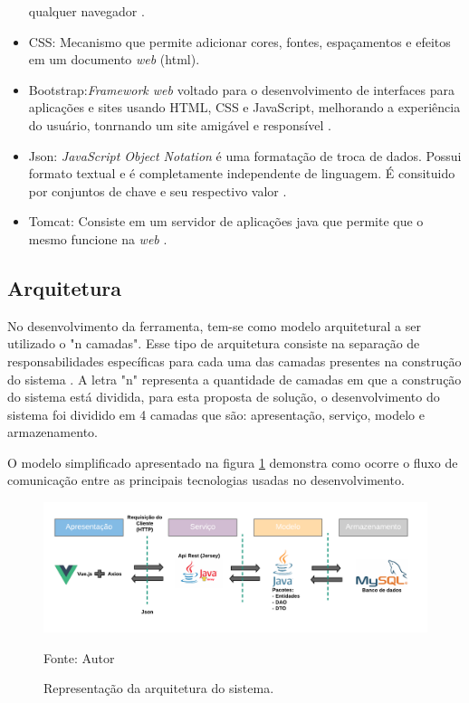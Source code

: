 \begin{itemize}
		qualquer navegador \cite{html}.
	\item CSS: Mecanismo que permite adicionar cores, fontes, espaçamentos e efeitos em um documento \textit{web} (html). \cite{css}
	\item Bootstrap:\textit{Framework web} voltado para o desenvolvimento de interfaces para aplicações e sites usando HTML, CSS e JavaScript, melhorando
		a experiência do usuário, tonrnando um site amigável e responsível \cite{bootstrap}.
	\item Json: \textit{JavaScript Object Notation} é uma formatação de troca de dados. Possui formato textual e é completamente independente de linguagem. É
		consituido por conjuntos de chave e seu respectivo valor \cite{json}.
	\item Tomcat: Consiste em um servidor de aplicações java que permite que o mesmo funcione na \textit{web} \cite{tomcat}.

\end{itemize}

\subsection{Arquitetura}

No desenvolvimento da ferramenta, tem-se como modelo arquitetural a ser utilizado o "n camadas". Esse tipo
de arquitetura consiste na separação de responsabilidades específicas para cada uma das camadas presentes 
na construção do sistema \cite{MSF}. A letra "n" representa a quantidade de camadas em que a construção do sistema 
está dividida, para esta proposta de solução, o desenvolvimento do sistema foi dividido em 4 camadas que são: apresentação, serviço, modelo
e armazenamento.

O modelo simplificado apresentado na figura \ref{arquitetura} demonstra como ocorre o fluxo de comunicação entre as principais tecnologias
usadas no desenvolvimento.

\begin{figure}[h]
	\centering
	\includegraphics[keepaspectratio=true,scale=0.8]{figuras/arquitetura.png}
	\caption{Representação da arquitetura do sistema.}
	Fonte: {Autor}
	\label{arquitetura}
\end{figure}		


